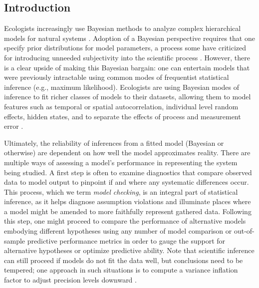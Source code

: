 \documentclass[12pt,english]{article}
\begin{document}
\begin{spacing}{1.9}
\def\VAR{{\rm Var}\,}
\def\COV{{\rm Cov}\,}
\def\Prob{{\rm P}\,}
\def\bfX{{\bf X}\,}
\def\bfY{{\bf Y}\,}
\def\bfZ{{\bf Z}\,}
\def\bftheta{\boldsymbol{\theta}\,}
\def\bfeta{\boldsymbol{\eta}\,}


\section{Introduction}

Ecologists increasingly use Bayesian methods to analyze complex hierarchical models for natural systems \citep{HootenHobbs2015}.  Adoption of a Bayesian perspective requires that one specify prior distributions for model parameters, a process some have criticized for introducing unneeded subjectivity into the scientific process \citep{LeleDennis2009}.  However, there is a clear upside of making this Bayesian bargain: one can entertain models that were previously intractable using common modes of frequentist statistical inference (e.g., maximum likelihood). Ecologists are using Bayesian modes of inference to fit richer classes of models to their datasets, allowing them to model features such as temporal or spatial autocorrelation, individual level random effects, hidden states, and to separate the effects of process and measurement error \citep{LinkEtAl2002,ClarkBjornstad2004,CressieEtAl2009}.

Ultimately, the reliability of inferences from a fitted model (Bayesian or otherwise) are dependent on how well the model approximates reality.  There are multiple ways of assessing a model's performance in representing the system being studied. A first step is often to examine diagnostics that compare observed data to model output to pinpoint if and where any systematic differences occur. This process, which we term \textit{model checking}, is an integral part of statistical inference, as it helps diagnose assumption violations and illuminate places where a model might be amended to more faithfully represent gathered data. Following this step, one might proceed to compare the performance of alternative models embodying different hypotheses using any number of model comparison or out-of-sample predictive performance metrics \citep[see][for a review]{HootenHobbs2015} in order to gauge the support for alternative hypotheses or optimize predictive ability.  Note that scientific inference can still proceed if models do not fit the data well, but conclusions need to be tempered; one approach in such situations is to compute a variance inflation factor to adjust precision levels downward \citep[e.g.][]{BurnhamAnderson2002}.


\end{spacing}
\end{document}
